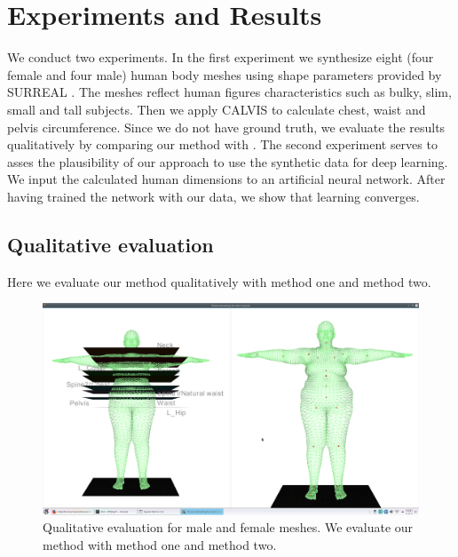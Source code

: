 \documentclass[runningheads, orivec]{llncs}
\begin{document}
\section{Experiments and Results}

We conduct two experiments. In the first experiment we synthesize eight (four 
female and four male) human body meshes using shape parameters provided by 
SURREAL \cite{varol17_surreal}.
The meshes reflect human figures characteristics such as bulky, slim, small and 
tall subjects. Then we apply CALVIS to calculate chest, waist and pelvis 
circumference. Since we do not have ground truth, we evaluate the results 
qualitatively by comparing our method 
with \cite{Dibra.2016b}.
The second 
experiment serves to asses the plausibility of our approach to use the 
synthetic data for deep learning. We input the calculated human 
dimensions to an artificial neural network. After having trained the network 
with our data, we show that learning converges.

\subsection{Qualitative evaluation}\label{subsec:qualitative_eval}
Here we evaluate our method qualitatively with method one and method two.
\begin{figure}[H]
	\begin{center}
		\includegraphics[width=\linewidth]{subject_6_with_cutting_planes_on_joints.eps}
	\end{center}
	\caption{Qualitative evaluation for male and female meshes. We evaluate our 
	method with method one and method two.}
	\label{fig:qualitative_eval}
\end{figure}
\end{document}
